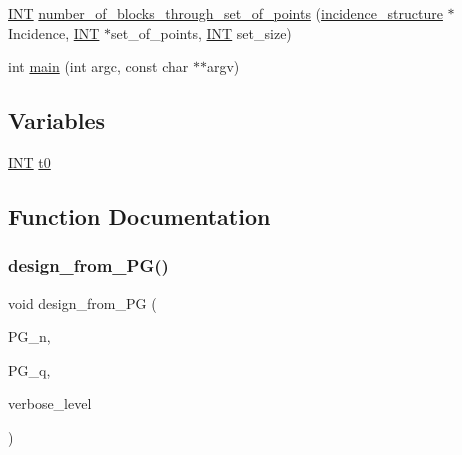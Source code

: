 \begin{DoxyCompactItemize}
\item 
\mbox{\hyperlink{galois_8h_a09fddde158a3a20bd2dcadb609de11dc}{I\+NT}} \mbox{\hyperlink{_a_p_p_s_2_c_o_m_b_i_n_a_t_o_r_i_c_s_2design_8_c_a5b0db90d64c604b9c5ca6070b77f4f42}{number\+\_\+of\+\_\+blocks\+\_\+through\+\_\+set\+\_\+of\+\_\+points}} (\mbox{\hyperlink{classincidence__structure}{incidence\+\_\+structure}} $\ast$Incidence, \mbox{\hyperlink{galois_8h_a09fddde158a3a20bd2dcadb609de11dc}{I\+NT}} $\ast$set\+\_\+of\+\_\+points, \mbox{\hyperlink{galois_8h_a09fddde158a3a20bd2dcadb609de11dc}{I\+NT}} set\+\_\+size)
\item 
int \mbox{\hyperlink{_a_p_p_s_2_c_o_m_b_i_n_a_t_o_r_i_c_s_2design_8_c_a217dbf8b442f20279ea00b898af96f52}{main}} (int argc, const char $\ast$$\ast$argv)
\end{DoxyCompactItemize}
\subsection*{Variables}
\begin{DoxyCompactItemize}
\item 
\mbox{\hyperlink{galois_8h_a09fddde158a3a20bd2dcadb609de11dc}{I\+NT}} \mbox{\hyperlink{_a_p_p_s_2_c_o_m_b_i_n_a_t_o_r_i_c_s_2design_8_c_a4268f4fe222ffb119218a0199f5e1904}{t0}}
\end{DoxyCompactItemize}


\subsection{Function Documentation}
\mbox{\label{_a_p_p_s_2_c_o_m_b_i_n_a_t_o_r_i_c_s_2design_8_c_aaac4564bcb168115351dacf8aefd1001}} 
\subsubsection{\texorpdfstring{design\+\_\+from\+\_\+\+P\+G()}{design\_from\_PG()}}
{\footnotesize\ttfamily void design\+\_\+from\+\_\+\+PG (\begin{DoxyParamCaption}\item[{\mbox{\hyperlink{galois_8h_a09fddde158a3a20bd2dcadb609de11dc}{I\+NT}}}]{P\+G\+\_\+n,  }\item[{\mbox{\hyperlink{galois_8h_a09fddde158a3a20bd2dcadb609de11dc}{I\+NT}}}]{P\+G\+\_\+q,  }\item[{\mbox{\hyperlink{galois_8h_a09fddde158a3a20bd2dcadb609de11dc}{I\+NT}}}]{verbose\+\_\+level }\end{DoxyParamCaption})}

